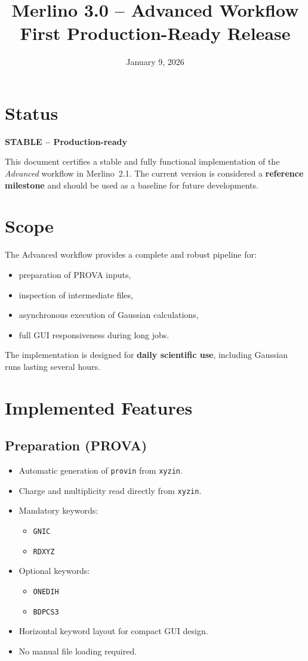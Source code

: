 \documentclass[11pt,a4paper]{article}
\title{\textbf{Merlino 3.0 -- Advanced Workflow}\\
\vspace{0.3cm}
\large First Production-Ready Release}
\author{}
\date{January 9, 2026}
\begin{document}
\maketitle

\section*{Status}
\textbf{STABLE -- Production-ready}

This document certifies a stable and fully functional implementation of the
\emph{Advanced} workflow in Merlino~2.1.
The current version is considered a \textbf{reference milestone} and should be
used as a baseline for future developments.

\section*{Scope}
The Advanced workflow provides a complete and robust pipeline for:
\begin{itemize}[nosep]
  \item preparation of PROVA inputs,
  \item inspection of intermediate files,
  \item asynchronous execution of Gaussian calculations,
  \item full GUI responsiveness during long jobs.
\end{itemize}

The implementation is designed for \textbf{daily scientific use}, including
Gaussian runs lasting several hours.

\section*{Implemented Features}

\subsection*{Preparation (PROVA)}
\begin{itemize}[nosep]
  \item Automatic generation of \texttt{provin} from \texttt{xyzin}.
  \item Charge and multiplicity read directly from \texttt{xyzin}.
  \item Mandatory keywords:
    \begin{itemize}[nosep]
      \item \texttt{GNIC}
      \item \texttt{RDXYZ}
    \end{itemize}
  \item Optional keywords:
    \begin{itemize}[nosep]
      \item \texttt{ONEDIH}
      \item \texttt{BDPCS3}
    \end{itemize}
  \item Horizontal keyword layout for compact GUI design.
  \item No manual file loading required.
\end{itemize}
\end{document}
